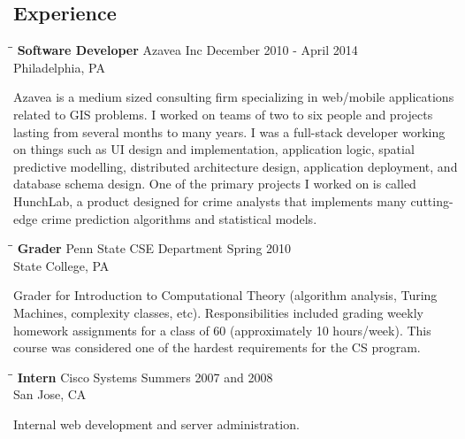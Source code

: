 \documentclass{res}
\begin{document}
\begin{resume}
\section{Experience}
   \vspace{-0.1in}	
   \begin{tabbing}
   \hspace{2.0in}\= \hspace{2.2in}\= \kill %
    {\bf Software Developer} \>Azavea Inc     \>December 2010 - April 2014\\
                             \>Philadelphia, PA
   \end{tabbing}\vspace{-17pt}      %
   Azavea is a medium sized consulting firm specializing in web/mobile
   applications related to GIS problems.  I worked
   on teams of two to six people and projects lasting from
   several months to many years.  I was a full-stack developer working on
   things such as UI design and implementation, application logic, spatial
   predictive modelling, distributed architecture design, application
   deployment, and database schema design.  One of the primary projects I
   worked on is called HunchLab, a product designed for crime analysts that
   implements many cutting-edge crime prediction algorithms and statistical
   models.
   \begin{tabbing}
   \hspace{2.0in}\= \hspace{2.2in}\= \kill %
   {\bf Grader} \> Penn State CSE Department\> Spring 2010\\
                          \>State College, PA
   \end{tabbing}\vspace{-17pt}
   Grader for Introduction to Computational Theory (algorithm analysis,
   Turing Machines, complexity classes, etc).
   Responsibilities included grading weekly homework assignments for a
   class of 60 (approximately 10 hours/week).
   This course was considered one of the hardest requirements for the CS program.

   \begin{tabbing}%
   \hspace{2.0in}\= \hspace{2.2in}\= \kill %
   {\bf Intern}  \> Cisco Systems\> Summers 2007 and 2008\\
                          \> San Jose, CA
   \end{tabbing}\vspace{-17pt}
   Internal web development and server administration.



\end{resume}
\end{document}

